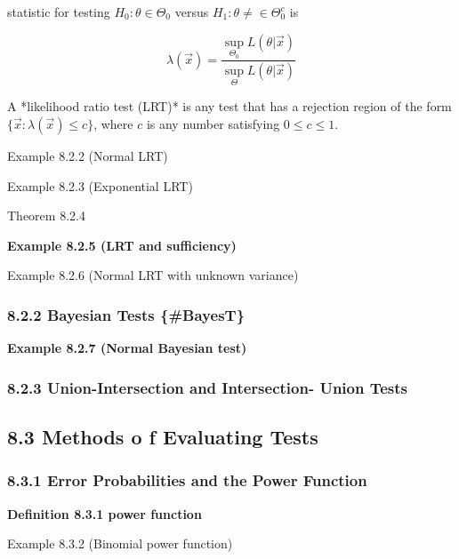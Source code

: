 \documentclass[10pt,twocolumn,portrait]{article}
\begin{document}
\begin{multicols}{2}

statistic for testing $H_0:\theta\in\Theta_0$ versus $H_1:\theta\ne\in\Theta_0^c$ is

$$\lambda(\vec x)=\frac{\sup\limits_{\Theta_0} L(\theta|\vec x)}{\sup\limits_{\Theta} L(\theta|\vec x)}$$

A *likelihood ratio test (LRT)* is any test that has a rejection region of the form $\{\vec x:\lambda(\vec x)\le c\}$, where $c$ is any number satisfying $0\le c\le 1$.

\end{multicols}

Example 8.2.2 (Normal LRT)

Example 8.2.3 (Exponential LRT)

Theorem 8.2.4

\textbf{Example 8.2.5 (LRT and sufficiency)}

Example 8.2.6 (Normal LRT with unknown variance)

\hypertarget{Norm-Bayes}{%
\subsubsection{8.2.2 Bayesian Tests \{\#BayesT\}}\label{Norm-Bayes}}

\textbf{Example 8.2.7 (Normal Bayesian test)}

\hypertarget{union-intersection-and-intersection--union-tests}{%
\subsubsection{8.2.3 Union-Intersection and Intersection- Union
Tests}\label{union-intersection-and-intersection--union-tests}}

\hypertarget{methods-o-f-evaluating-tests}{%
\subsection{8.3 Methods o f Evaluating
Tests}\label{methods-o-f-evaluating-tests}}

\hypertarget{power}{%
\subsubsection{8.3.1 Error Probabilities and the Power
Function}\label{power}}

\textbf{Definition 8.3.1 power function}

Example 8.3.2 (Binomial power function)
\end{document}
